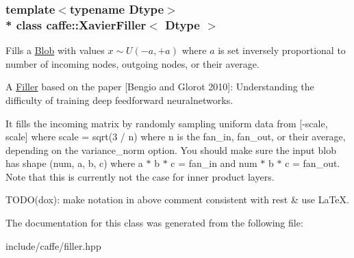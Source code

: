 \subsubsection*{template$<$typename Dtype$>$\\*
class caffe\+::\+Xavier\+Filler$<$ Dtype $>$}

Fills a \hyperlink{classcaffe_1_1Blob}{Blob} with values $ x \sim U(-a, +a) $ where $ a $ is set inversely proportional to number of incoming nodes, outgoing nodes, or their average. 

A \hyperlink{classcaffe_1_1Filler}{Filler} based on the paper \mbox{[}Bengio and Glorot 2010\mbox{]}\+: Understanding the difficulty of training deep feedforward neuralnetworks.

It fills the incoming matrix by randomly sampling uniform data from \mbox{[}-\/scale, scale\mbox{]} where scale = sqrt(3 / n) where n is the fan\+\_\+in, fan\+\_\+out, or their average, depending on the variance\+\_\+norm option. You should make sure the input blob has shape (num, a, b, c) where a $\ast$ b $\ast$ c = fan\+\_\+in and num $\ast$ b $\ast$ c = fan\+\_\+out. Note that this is currently not the case for inner product layers.

T\+O\+D\+O(dox)\+: make notation in above comment consistent with rest \& use La\+TeX. 

The documentation for this class was generated from the following file\+:\begin{DoxyCompactItemize}
\item 
include/caffe/filler.\+hpp\end{DoxyCompactItemize}
